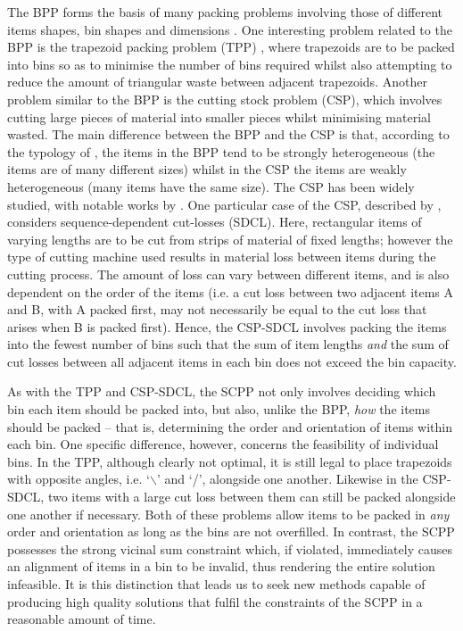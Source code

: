 \documentclass[a4paper,11pt,authoryear]{elsarticle}
\newcommand{\rev}[1]{{\color{myRed}#1}}
\begin{document}
\noindent The BPP forms the basis of many packing problems involving those of different items shapes, bin shapes and dimensions \citep{haouari2009, kenmochi2009, xavier2008}. One interesting problem related to the BPP is the trapezoid packing problem (TPP) \citep{lewis2011, lewis2017}, where trapezoids are to be packed into bins so as to minimise the number of bins required whilst also attempting to reduce the amount of triangular waste between adjacent trapezoids. Another problem similar to the BPP is the cutting stock problem (CSP), which involves cutting large pieces of material into smaller pieces whilst minimising material wasted. \rev{The main difference between the BPP and the CSP is that, according to the typology of \citet{wascher2007}, the items in the BPP tend to be strongly heterogeneous (the items are of many different sizes) whilst in the CSP the items are weakly heterogeneous (many items have the same size). The CSP has been widely studied, with notable works by \citet{gilmore1961, gilmore1963}.} One particular case of the CSP, described by \cite{garraffa2016}, considers sequence-dependent cut-losses (SDCL). Here, rectangular items of varying lengths are to be cut from strips of material of fixed lengths; however the type of cutting machine used results in material loss between items during the cutting process. The amount of loss can vary between different items, and is also dependent on the order of the items (i.e. a cut loss between two adjacent items A and B, with A packed first, may not necessarily be equal to the cut loss that arises when B is packed first). Hence, the CSP-SDCL involves packing the items into the fewest number of bins such that the sum of item lengths \emph{and} the sum of cut losses between all adjacent items in each bin does not exceed the bin capacity.

As with the TPP and CSP-SDCL, the SCPP not only involves deciding which bin each item should be packed into, but also, unlike the BPP, \emph{how} the items should be packed -- that is, determining the order and orientation of items within each bin. One specific difference, however, concerns the feasibility of individual bins. In the TPP, although clearly not optimal, it is still legal to place trapezoids with opposite angles, i.e. `$\backslash$' and `/', alongside one another. Likewise in the CSP-SDCL, two items with a large cut loss between them can still be packed alongside one another if necessary. Both of these problems allow items to be packed in \emph{any} order and orientation as long as the bins are not overfilled. In contrast, the SCPP possesses the strong vicinal sum constraint which, if violated, immediately causes an alignment of items in a bin to be invalid, thus rendering the entire solution infeasible. It is this distinction that leads us to seek new methods capable of producing high quality solutions that fulfil the constraints of the SCPP in a reasonable amount of time.
\end{document}
